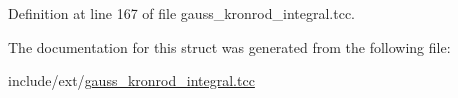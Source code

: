 Definition at line 167 of file gauss\+\_\+kronrod\+\_\+integral.\+tcc.



The documentation for this struct was generated from the following file\+:\begin{DoxyCompactItemize}
\item 
include/ext/\hyperlink{gauss__kronrod__integral_8tcc}{gauss\+\_\+kronrod\+\_\+integral.\+tcc}\end{DoxyCompactItemize}
